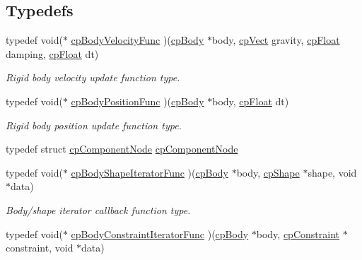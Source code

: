 \subsection*{Typedefs}
\begin{DoxyCompactItemize}
\item 
\hypertarget{group__cp_body_ga728eb52bef6367e8e33abff7dba0a089}{typedef void($\ast$ \hyperlink{group__cp_body_ga728eb52bef6367e8e33abff7dba0a089}{cp\-Body\-Velocity\-Func} )(\hyperlink{structcp_body}{cp\-Body} $\ast$body, \hyperlink{structcp_vect}{cp\-Vect} gravity, \hyperlink{group__basic_types_gac1ed65573e035bf892505768c852d8d3}{cp\-Float} damping, \hyperlink{group__basic_types_gac1ed65573e035bf892505768c852d8d3}{cp\-Float} dt)}\label{group__cp_body_ga728eb52bef6367e8e33abff7dba0a089}

\begin{DoxyCompactList}\small\item\em Rigid body velocity update function type. \end{DoxyCompactList}\item 
\hypertarget{group__cp_body_ga4f84c8fc20fcb9918d1553e6dc29ffbd}{typedef void($\ast$ \hyperlink{group__cp_body_ga4f84c8fc20fcb9918d1553e6dc29ffbd}{cp\-Body\-Position\-Func} )(\hyperlink{structcp_body}{cp\-Body} $\ast$body, \hyperlink{group__basic_types_gac1ed65573e035bf892505768c852d8d3}{cp\-Float} dt)}\label{group__cp_body_ga4f84c8fc20fcb9918d1553e6dc29ffbd}

\begin{DoxyCompactList}\small\item\em Rigid body position update function type. \end{DoxyCompactList}\item 
typedef struct \hyperlink{group__cp_body_gafd1d958a322b86c54e6b0a7109e4b0b9}{cp\-Component\-Node} \hyperlink{group__cp_body_gafd1d958a322b86c54e6b0a7109e4b0b9}{cp\-Component\-Node}
\item 
\hypertarget{group__cp_body_ga2a71c91a297ece9ab06101df4b726645}{typedef void($\ast$ \hyperlink{group__cp_body_ga2a71c91a297ece9ab06101df4b726645}{cp\-Body\-Shape\-Iterator\-Func} )(\hyperlink{structcp_body}{cp\-Body} $\ast$body, \hyperlink{structcp_shape}{cp\-Shape} $\ast$shape, void $\ast$data)}\label{group__cp_body_ga2a71c91a297ece9ab06101df4b726645}

\begin{DoxyCompactList}\small\item\em Body/shape iterator callback function type. \end{DoxyCompactList}\item 
\hypertarget{group__cp_body_ga79c674e7767d6ff8769a9676404f589b}{typedef void($\ast$ \hyperlink{group__cp_body_ga79c674e7767d6ff8769a9676404f589b}{cp\-Body\-Constraint\-Iterator\-Func} )(\hyperlink{structcp_body}{cp\-Body} $\ast$body, \hyperlink{structcp_constraint}{cp\-Constraint} $\ast$constraint, void $\ast$data)}\label{group__cp_body_ga79c674e7767d6ff8769a9676404f589b}


\end{DoxyCompactItemize}
